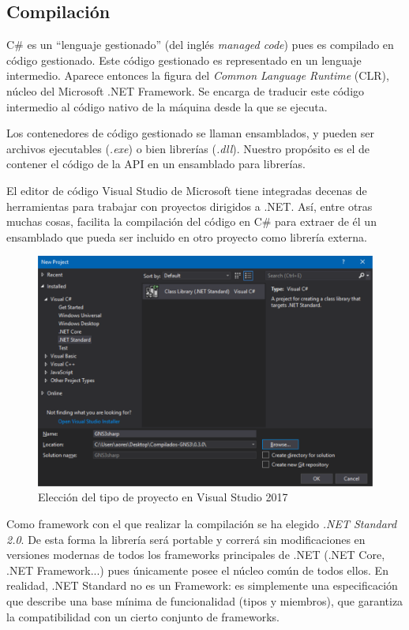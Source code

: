 \subsection{Compilación}
C\# es un ``lenguaje gestionado'' (del inglés \textit{managed code}) pues es compilado en código gestionado. Este código gestionado es representado en un lenguaje intermedio. Aparece entonces la figura del \textit{Common Language Runtime} (CLR), núcleo del Microsoft .NET Framework. Se encarga de traducir este código intermedio al código nativo de la máquina desde la que se ejecuta.

Los contenedores de código gestionado se llaman ensamblados, y pueden ser archivos ejecutables (\textit{.exe}) o bien librerías (\textit{.dll})\cite{csnutshell}. Nuestro propósito es el de contener el código de la API en un ensamblado para librerías.

El editor de código Visual Studio de Microsoft tiene integradas decenas de herramientas para trabajar con proyectos dirigidos a .NET. Así, entre otras muchas cosas, facilita la compilación del código en C\# para extraer de él un ensamblado que pueda ser incluido en otro proyecto como librería externa.

\begin{figure}[h]
  \centering
  \includegraphics[scale=0.225]{imagenes/creacion_ensamblado}
  \caption{Elección del tipo de proyecto en Visual Studio 2017}
  \label{fig:creacion_ensamblado}
\end{figure}

Como framework con el que realizar la compilación se ha elegido \textit{.NET Standard 2.0}. De esta forma la librería será portable y correrá sin modificaciones en versiones modernas de todos los frameworks principales de .NET (.NET Core, .NET Framework...) pues únicamente posee el núcleo común de todos ellos. En realidad, .NET Standard no es un Framework: es simplemente una especificación que describe una base mínima de funcionalidad (tipos y miembros), que garantiza la compatibilidad con un cierto conjunto de frameworks.

